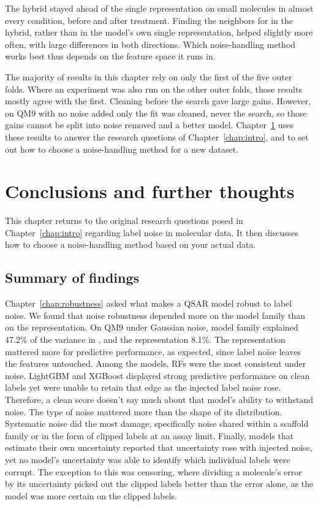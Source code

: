 The hybrid stayed ahead of the single representation on small molecules in almost every condition, before and after treatment. Finding the neighbors for  in the hybrid, rather than in the model's own single representation, helped slightly more often, with large differences in both directions. Which noise-handling method works best thus depends on the feature space it runs in.

\label{sec:noise:limitations}

The majority of results in this chapter rely on only the first of the five outer folds. Where an experiment was also run on the other outer folds, those results mostly agree with the first. Cleaning before the search gave large gains. However, on QM9 with no noise added only the fit was cleaned, never the search, so those gains cannot be split into noise removed and a better model. Chapter~\ref{chap:discussion} uses these results to answer the research questions of Chapter~\ref{chap:intro}, and to set out how to choose a noise-handling method for a new dataset.

\chapter{Conclusions and further thoughts}\label{chap:discussion}

This chapter returns to the original research questions posed in Chapter~\ref{chap:intro} regarding label noise in molecular data. It then discusses how to choose a noise-handling method based on your actual data.

\section{Summary of findings}\label{sec:discussion:summary}\label{sec:discussion:antibodies}

Chapter~\ref{chap:robustness} asked what makes a QSAR model robust to label noise. We found that noise robustness depended more on the model family than on the representation. On QM9 under Gaussian noise, model family explained 47.2\% of the variance in \aucnorm{}, and the representation 8.1\%. The representation mattered more for predictive performance, as expected, since label noise leaves the features untouched. Among the models, RFs were the most consistent under noise. LightGBM and XGBoost displayed strong predictive performance on clean labels yet were unable to retain that edge as the injected label noise rose. Therefore, a clean score doesn't say much about that model's ability to withstand noise. The type of noise mattered more than the shape of its distribution. Systematic noise did the most damage, specifically noise shared within a scaffold family or in the form of clipped labels at an assay limit. Finally, models that estimate their own uncertainty reported that uncertainty rose with injected noise, yet no model's uncertainty was able to identify which individual labels were corrupt. The exception to this was censoring, where dividing a molecule's error by its uncertainty picked out the clipped labels better than the error alone, as the model was more certain on the clipped labels. 


